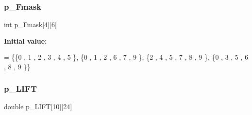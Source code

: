 \subsubsection{\texorpdfstring{p\+\_\+\+Fmask}{p\_Fmask}}
{\footnotesize\ttfamily int p\+\_\+\+Fmask\mbox{[}4\mbox{]}\mbox{[}6\mbox{]}}

{\bfseries Initial value\+:}
\begin{DoxyCode}
= \{\{0 , 1 , 2 , 3 , 4 , 5 \},
\{0 , 1 , 2 , 6 , 7 , 9 \},
\{2 , 4 , 5 , 7 , 8 , 9 \},
\{0 , 3 , 5 , 6 , 8 , 9 \}\}
\end{DoxyCode}
\mbox{\label{a00482_ae35710fabe458ad830273cab6823c259}} 
\subsubsection{\texorpdfstring{p\+\_\+\+L\+I\+FT}{p\_LIFT}}
{\footnotesize\ttfamily double p\+\_\+\+L\+I\+FT\mbox{[}10\mbox{]}\mbox{[}24\mbox{]}}

